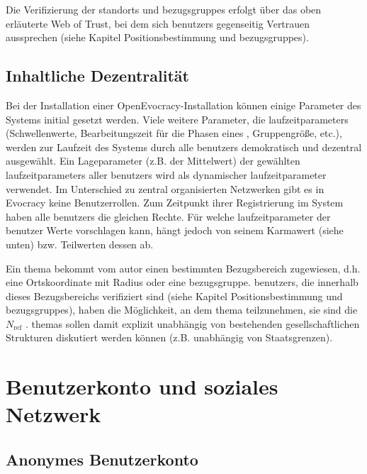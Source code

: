 \documentclass[10pt]{article}
\begin{document}
Die Verifizierung der \glspl{standort} und \glspl{bezugsgruppe} erfolgt über das oben erläuterte Web of Trust, bei dem sich \glspl{benutzer} gegenseitig Vertrauen aussprechen (siehe Kapitel Positionsbestimmung und \glspl{bezugsgruppe}).

\subsection{Inhaltliche Dezentralität}

Bei der Installation einer OpenEvocracy-Installation können einige Parameter des Systems initial gesetzt werden. Viele weitere Parameter, die \glspl{laufzeitparameter} (Schwellenwerte, Bearbeitungszeit für die Phasen eines , Gruppengröße, etc.), werden zur Laufzeit des Systems durch alle \glspl{benutzer} demokratisch und dezentral ausgewählt. Ein Lageparameter (z.B. der Mittelwert) der gewählten \glspl{laufzeitparameter} aller \glspl{benutzer} wird als dynamischer \gls{laufzeitparameter} verwendet. Im Unterschied zu zentral organisierten Netzwerken gibt es in Evocracy keine Benutzerrollen. Zum Zeitpunkt ihrer Registrierung im System haben alle \glspl{benutzer} die gleichen Rechte. Für welche \gls{laufzeitparameter} der \gls{benutzer} Werte vorschlagen kann, hängt jedoch von seinem Karmawert (siehe unten) bzw. Teilwerten dessen ab.

Ein \gls{thema} bekommt vom \gls{autor} einen bestimmten Bezugsbereich zugewiesen, d.h. eine Ortskoordinate mit Radius oder eine \gls{bezugsgruppe}. \glspl{benutzer}, die innerhalb dieses Bezugsbereichs verifiziert sind (siehe Kapitel Positionsbestimmung und \glspl{bezugsgruppe}), haben die Möglichkeit, an dem \gls{thema} teilzunehmen, sie sind die $N_{\text{ref}}$ . \glspl{thema} sollen damit explizit unabhängig von bestehenden gesellschaftlichen Strukturen diskutiert werden können (z.B. unabhängig von Staatsgrenzen).


\section{Benutzerkonto und soziales Netzwerk}

\subsection{Anonymes Benutzerkonto}
\end{document}
